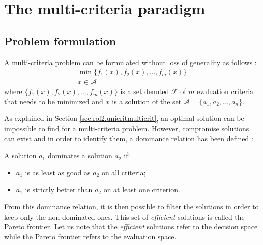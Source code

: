 \section{The multi-criteria paradigm}
\label{sec:rol2.multicrit_paradigm}


\subsection{Problem formulation}
A multi-criteria problem can be formulated without loss of generality as follows \cite{BraMar2002}:
\begin{equation}
\label{multicrit_formulation}
\begin{gathered}
\min \{f_1(x), f_2(x), \dots, f_m(x)\}\\
x \in \mathcal{A}
\end{gathered}
\end{equation}
where $\{f_1(x), f_2(x), \dots, f_m(x)\}$ is a set denoted $\mathcal{F}$ of $m$ evaluation criteria that needs to be minimized and $x$ is a solution of the set $\mathcal{A} = \{a_1, a_2, \dots, a_n\}$.

As explained in Section \ref{sec:rol2.unicritmulticrit}, an optimal solution can be impossible to find for a multi-criteria problem. However, compromise solutions can exist and in order to identify them, a dominance relation has been defined \cite{BraMar2002}:

\begin{definition}[Dominance]
A solution $a_1$ dominates a solution $a_2$ if:
\begin{itemize}
\item $a_1$ is as least as good as $a_2$ on all criteria;
\item $a_1$ is strictly better than $a_2$ on at least one criterion.
\end{itemize}
\end{definition}

From this dominance relation, it is then possible to filter the solutions in order to keep only the non-dominated ones. This set of \emph{efficient} solutions is called the Pareto frontier. Let us note that the \emph{efficient} solutions refer to the decision space while the Pareto frontier refers to the evaluation space.

